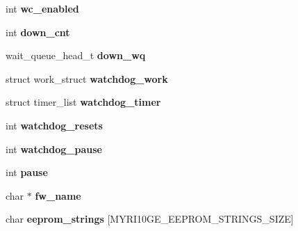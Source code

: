 \begin{DoxyCompactItemize}
\item 
\hypertarget{structmyri10ge__priv_a118d50a8a093b968717e5ba8606a0365}{
int {\bfseries wc\_\-enabled}}
\label{structmyri10ge__priv_a118d50a8a093b968717e5ba8606a0365}

\item 
\hypertarget{structmyri10ge__priv_adf3bf06f798d4410a3ae5054de37e822}{
int {\bfseries down\_\-cnt}}
\label{structmyri10ge__priv_adf3bf06f798d4410a3ae5054de37e822}

\item 
\hypertarget{structmyri10ge__priv_a86ab8713f2ad6b5734f88c47ad006728}{
wait\_\-queue\_\-head\_\-t {\bfseries down\_\-wq}}
\label{structmyri10ge__priv_a86ab8713f2ad6b5734f88c47ad006728}

\item 
\hypertarget{structmyri10ge__priv_a737122203262241af41b1967911ce923}{
struct work\_\-struct {\bfseries watchdog\_\-work}}
\label{structmyri10ge__priv_a737122203262241af41b1967911ce923}

\item 
\hypertarget{structmyri10ge__priv_a28407eec1af913330e19e29fee3f9c1b}{
struct timer\_\-list {\bfseries watchdog\_\-timer}}
\label{structmyri10ge__priv_a28407eec1af913330e19e29fee3f9c1b}

\item 
\hypertarget{structmyri10ge__priv_a890da06ecd2b10050ed3c2c3895d9f03}{
int {\bfseries watchdog\_\-resets}}
\label{structmyri10ge__priv_a890da06ecd2b10050ed3c2c3895d9f03}

\item 
\hypertarget{structmyri10ge__priv_aa9f855b769fe36bd5170c615680936e6}{
int {\bfseries watchdog\_\-pause}}
\label{structmyri10ge__priv_aa9f855b769fe36bd5170c615680936e6}

\item 
\hypertarget{structmyri10ge__priv_ade6eea3adfb8a503a09c74ca3fdbcdc6}{
int {\bfseries pause}}
\label{structmyri10ge__priv_ade6eea3adfb8a503a09c74ca3fdbcdc6}

\item 
\hypertarget{structmyri10ge__priv_abe4ac0016609a6f7bd4fddfa9b9acded}{
char $\ast$ {\bfseries fw\_\-name}}
\label{structmyri10ge__priv_abe4ac0016609a6f7bd4fddfa9b9acded}

\item 
\hypertarget{structmyri10ge__priv_a75d15a0ceab724fb0ac84abab9194768}{
char {\bfseries eeprom\_\-strings} \mbox{[}MYRI10GE\_\-EEPROM\_\-STRINGS\_\-SIZE\mbox{]}}
\label{structmyri10ge__priv_a75d15a0ceab724fb0ac84abab9194768}


\end{DoxyCompactItemize}
